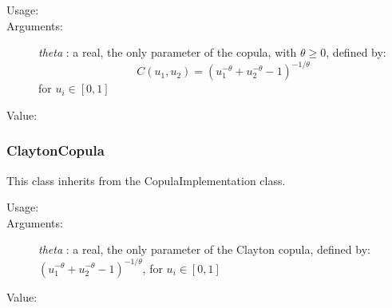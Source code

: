 \begin{description}

\item[Usage:] \rule{0pt}{1em}


\item[Arguments:]  \textit{theta}    : a real, the only parameter of the copula, with $\theta\geq 0$, defined by:
\begin{equation}
C(u_1, u_2)  = \displaystyle \left(u_1^{-\theta}+u_2^{-\theta}-1\right)^{-1/\theta}
\end{equation}
for $u_i \in [0,1]$

\item[Value:]  \rule{0pt}{1em}

\end{description}

\newpage
\subsubsection{ClaytonCopula}

This class inherits from the CopulaImplementation class.

\begin{description}

\item[Usage:] \rule{0pt}{1em}


\item[Arguments:]  \textit{theta}    : a real, the only parameter of the Clayton copula, defined by: $\displaystyle \left(u_1^{-\theta}+u_2^{-\theta}-1\right)^{-1/\theta}$, for $u_i \in [0,1]$

\item[Value:]  \rule{0pt}{1em}

\end{description}

